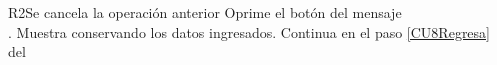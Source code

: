 \begin{UCtrayectoriaA}{R2}{Se cancela la operación anterior}
    \UCpaso[\UCactor] Oprime el botón  del mensaje
        \\\textbf{}.
    \UCpaso Muestra  conservando los datos ingresados.
    \UCpaso Continua en el paso \ref{CU8Regresa} del 
\end{UCtrayectoriaA}
